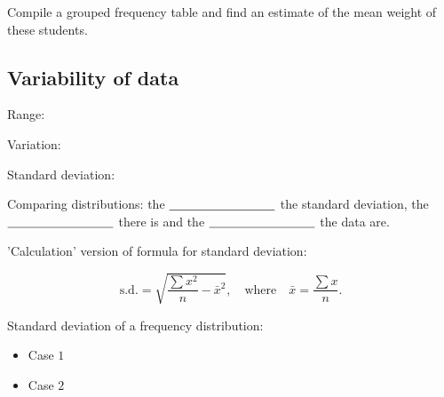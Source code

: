 \begin{enumerate}
 Compile a grouped frequency table and find an estimate of the mean weight of these students.	

\end{enumerate}


\newpage

\subsection{Variability of data}


Range:


\vspace{1.5cm}

Variation:

\vspace{1.5cm}

Standard deviation:
\vspace{2cm}

Comparing distributions:  the $\underline{\hspace{3 cm}}$ the standard deviation, the $\underline{\hspace{3 cm}}$ there is and the $\underline{\hspace{3 cm}}$ the data are.
\medskip

'Calculation' version of formula for standard deviation: 

\[
\text{s.d.} = \sqrt{\frac{\sum x^2 }{n}  - \bar{x}^2},\quad \text{where} \quad \bar{x} = \frac{\sum x}{n}.
\] 

Standard deviation of a frequency distribution:

\begin{itemize}
	\item Case $1$
	\item Case $2$
\end{itemize}


\exercise  %

